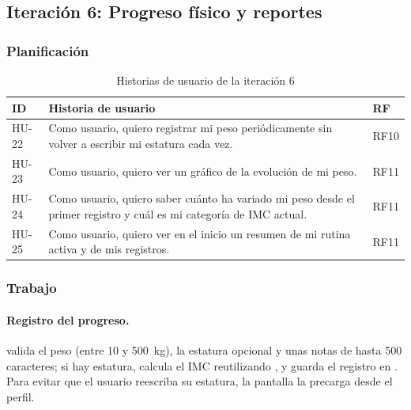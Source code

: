
\subsection{Iteración 6: Progreso físico y reportes}
\label{subsec:it6}

\subsubsection{Planificación}

\begin{table}[H]
\centering
\caption{Historias de usuario de la iteración 6}
\label{tab:hu-it6}
\begin{tabularx}{\textwidth}{|L{1.2cm}|Y|L{1.5cm}|}
\hline
{} \textbf{ID} & \textbf{Historia de usuario} & \textbf{RF} \\
\hline
HU-22 & Como usuario, quiero registrar mi peso periódicamente sin volver a
escribir mi estatura cada vez. & RF10 \\ \hline
HU-23 & Como usuario, quiero ver un gráfico de la evolución de mi peso. &
RF11 \\ \hline
HU-24 & Como usuario, quiero saber cuánto ha variado mi peso desde el primer
registro y cuál es mi categoría de IMC actual. & RF11 \\ \hline
HU-25 & Como usuario, quiero ver en el inicio un resumen de mi rutina activa
y de mis registros. & RF11 \\
\hline
\end{tabularx}
\end{table}

\subsubsection{Trabajo}

\paragraph{Registro del progreso.}  valida el
peso (entre 10 y 500~kg), la estatura opcional y unas notas de hasta 500
caracteres; si hay estatura, calcula el IMC reutilizando
, y guarda el registro en
. Para evitar que el usuario
reescriba su estatura, la pantalla la precarga desde el perfil.


